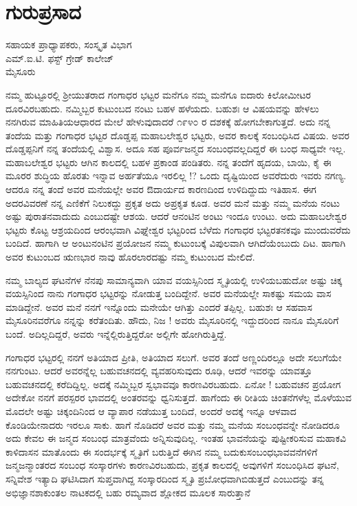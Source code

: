 {\fontsize{14}{16}\selectfont
\chapter{ಗುರುಪ್ರಸಾದ}

\begin{center}
\smallskip

ಸಹಾಯಕ ಪ್ರಾಧ್ಯಾಪಕರು, ಸಂಸ್ಕೃತ ವಿಭಾಗ\\
ಎಮ್.ಐ.ಟಿ. ಫಸ್ಟ್ ಗ್ರೇಡ್ ಕಾಲೇಜ್\\
ಮೈಸೂರು
\addrule
\end{center}

 ನಮ್ಮ ಹುಟ್ಟೂರಲ್ಲಿ ಶ್ರೀಯುತರಾದ ಗಂಗಾಧರ ಭಟ್ಟರ ಮನೆಗೂ ನಮ್ಮ ಮನೆಗೂ ಐದಾರು ಕಿಲೋಮೀಟರ ದೂರವಿರಬಹುದು. ನಮ್ಮಿಬ್ಬರ ಕುಟುಂಬದ ನಂಟು ಬಹಳ ಹಳೆಯದು. ಬಹುಶಃ ಆ  ವಿಷಯವನ್ನು ಹೇಳಲು ನನಗಿರುವ ಮಾಹಿತಿಯ\break ಆಧಾರದ ಮೇಲೆ ಹೇಳುವುದಾದರೆ ೧೯೪೦ ರ ದಶಕಕ್ಕೆ ಹೋಗಬೇಕಾಗುತ್ತದೆ. ಅದು ನನ್ನ ತಂದೆಯ ಮತ್ತು ಗಂಗಾಧರ ಭಟ್ಟರ ದೊಡ್ಡಪ್ಪ \enginline{-} ಮಹಾ\-ಬಲೇಶ್ವರ ಭಟ್ಟರು, ಅವರ ಕಾಲಕ್ಕೆ ಸಂಬಂಧಿಸಿದ ವಿಷಯ. ಅವರ ದೊಡ್ಡಪ್ಪನಿಗೆ ನನ್ನ ತಂದೆಯಲ್ಲಿ ವಿಶ್ವಾಸ. ಅದೂ ಸಹ ಪೂರ್ವಜನ್ಮದ ಸಂಬಂಧವಲ್ಲದಿದ್ದರೆ ಈ ಬಂಧ ಸಾಧ್ಯವೇ ಇಲ್ಲ. ಮಹಾ\-ಬಲೇಶ್ವರ ಭಟ್ಟರು ಆಗಿನ ಕಾಲದಲ್ಲಿ ಬಹಳ ಪ್ರಕಾಂಡ ಪಂಡಿತರು. ನನ್ನ ತಂದೆಗೆ ಹೃದಯ, ಬಾಯಿ, ಕೈ ಈ ಮೂರರ ಶುದ್ಧಿಯ ಹೊರತು ಇನ್ನಾವ ಅರ್ಹತೆಯೂ ಇರಲಿಲ್ಲ !? ಒಂದು ದೃಷ್ಟಿಯಿಂದ ಅವರೆದುರು ಇವರು ನಗಣ್ಯ. ಆದರೂ ನನ್ನ ತಂದೆ ಅವರ ಮನೆಯಲ್ಲೇ ಅವರ ಔದಾರ್ಯದ ಕಾರಣದಿಂದ ಉಳಿದಿದ್ದುದು ಇತಿಹಾಸ. ಈಗ ಅದರ\break ವಿವರಣೆ ನನ್ನ ಎಣಿಕೆಗೆ ನಿಲುಕದ್ದು \enginline{-} ಪ್ರಕೃತ ಅದು ಅಪ್ರಕೃತ ಕೂಡ. ಅವರ ಮನೆ ಮತ್ತು ನಮ್ಮ ಮನೆಯ ನಂಟು ಅಷ್ಟು ಪುರಾತನವಾದುದು ಎಂಬುದಷ್ಟೇ ಆಶಯ. ಆದರೆ ಆ\break ನಂಟಿನ ಅಂಟು ಇಂದೂ ಉಂಟು. ಅದು ಮಹಾಬಲೇಶ್ವರ ಭಟ್ಟರು ಕೊಟ್ಟ ಆಶ್ರಯ\-ದಿಂದ ಆರಂಭವಾಗಿ ವಿಘ್ನೇಶ್ವರ ಭಟ್ಟರಿಂದ ಬೆಳೆದು ಗಂಗಾಧರ ಭಟ್ಟರ\break ತನಕವೂ ಮುಂದುವರೆದು ಬಂದಿದೆ. ಹಾಗಾಗಿ ಆ ಅಂಟು\enginline{-}ನಂಟಿನ ಪ್ರಯೋಜನ ನಮ್ಮ ಕುಟುಂಬಕ್ಕೆ ವಿಪುಲವಾಗಿ ಆಗಿದೆಯೆಂಬುದು ದಿಟ. ಹಾಗಾಗಿ ಅವರ ಕುಟುಂಬದ ಋಣಭಾರ ನಾವು ಹೊರಲಾರದಷ್ಟು ನಮ್ಮ ಕುಟುಂಬದ ಮೇಲಿದೆ.

ನಮ್ಮ ಬಾಲ್ಯದ ಘಟನೆಗಳ ನೆನಪು ಸಾಮಾನ್ಯವಾಗಿ ಯಾವ ವಯಸ್ಸಿನಿಂದ ಸ್ಮೃತಿಯಲ್ಲಿ ಉಳಿಯಬಹುದೋ ಅಷ್ಟು ಚಿಕ್ಕ ವಯಸ್ಸಿನಿಂದ ನಾನು ಗಂಗಾಧರ ಭಟ್ಟರನ್ನು ನೋಡುತ್ತ ಬಂದಿದ್ದೇನೆ. ಅವರ ಮನೆಯಲ್ಲೇ ಸಾಕಷ್ಟು ಸಮಯ ವಾಸ ಮಾಡಿದ್ದೇನೆ. ಅವರ ಮನೆ ನನಗೆ ಇನ್ನೊಂದು ಮನೇಯೇ ಆಗಿತ್ತು ಎಂದರೆ ತಪ್ಪಿಲ್ಲ. ಬಹುಶಃ ಆ ಸಹವಾಸ ಮೈಸೂರಿನವರೆಗೂ ನನ್ನನ್ನು ಕರೆತಂದಿತು. ಹೌದು, ನಿಜ ! ಅವರು ಮೈಸೂರಿನಲ್ಲಿ ಇದ್ದುದರಿಂದ ನಾನೂ ಮೈಸೂರಿಗೆ ಬಂದೆ. ಅದಿಲ್ಲದಿದ್ದರೆ,  ಅವರು ಇನ್ನೆಲ್ಲಿರುತ್ತಿದ್ದರೋ ಅಲ್ಲಿಗೇ ಹೋಗಿರುತ್ತಿದ್ದೆ.

ಗಂಗಾಧರ ಭಟ್ಟರಲ್ಲಿ ನನಗೆ ಅತಿಯಾದ ಪ್ರೀತಿ, ಅತಿಯಾದ ಸಲುಗೆ. ಅವರ ತಂದೆ ಅಣ್ಣಂದಿರಲ್ಲೂ ಅದೇ ಸಲುಗೆಯೇ ನನಗುಂಟು. ಆದರೆ ಅವರನ್ನೆಲ್ಲ ಬಹುವಚನದಲ್ಲಿ ವ್ಯವಹರಿಸುವುದು ರೂಢಿ, ಆದರೆ ಇವರನ್ನು ಯಾವತ್ತೂ ಬಹುವಚನದಲ್ಲಿ ಕರೆದಿದ್ದಿಲ್ಲ. ಅದಕ್ಕೆ ನಮ್ಮಿಬ್ಬರ ಸ್ವಭಾವವೂ ಕಾರಣವಿರಬಹುದು. ಏನೋ ! ಬಹುವಚನ ಪ್ರಯೋಗ ಅದೇಕೋ ನನಗೆ ಪರಸ್ಪರರ ಭಾವದಲ್ಲಿ ಅಂತರವನ್ನು ಧ್ವನಿಸುತ್ತದೆ. ಹಾಗೆಂದು ಈ ರೀತಿಯ ಚಿಂತನೆಗಳೆಲ್ಲ ಮೊಳೆಯುವ ಮೊದಲೇ \enginline{-} ಅಷ್ಟು ಚಿಕ್ಕಂದಿನಿಂದ ಆ ವ್ಯಾಪಾರ ನಡೆಯುತ್ತ ಬಂದಿದೆ, ಅಂದರೆ ಅದಕ್ಕೆ ಇನ್ನೂ ಆಳವಾದ ಕೊಂಡಿಯೇನಾದರು ಇರಲೂ ಸಾಕು. ಹಾಗೆ ನೊಡಿದರೆ ಅವರ ಮತ್ತು ನಮ್ಮ ಮನೆಯ ಸಂಬಂಧವನ್ನೇ ನೋಡಿದರೂ ಅದು ಕೇವಲ ಈ ಜನ್ಮದ ಸಂಬಂಧ ಮಾತ್ರವೆಂದು ಅನ್ನಿಸುವುದಿಲ್ಲ. ಇಂತಹ ಭಾವನೆಯನ್ನು  ಪುಷ್ಟೀಕರಿಸುವ  ಮಹಾಕವಿ ಕಾಳಿದಾಸನ ಮಾತೊಂದು ಈ ಸಂದರ್ಭಕ್ಕೆ \hbox{ಸ್ಮೃತಿಗೆ} ಬರುತ್ತಿದೆ \enginline{-} ಈಗಿನ ನಮ್ಮ ಬದುಕು\enginline{-}ಸಂಬಂಧ\enginline{-}ಭಾವವನೆಗಳಿಗೆ ಜನ್ಮ\enginline{-}ಜನ್ಮಾಂತರದ ಸಂಬಂಧ \enginline{-} ಸಂಸ್ಕಾರಗಳು ಕಾರಣವಿರಬಹುದು, ಪ್ರಕೃತ ಕಾಲದಲ್ಲಿ ಅವುಗಳಿಗೆ \break ಸಂಬಂಧಿಸಿದ ಘಟನೆ, ಸನ್ನಿವೇಶ  ಇತ್ಯಾದಿ  ಘಟಿಸಿದಾಗ ಸುಪ್ತವಾಗಿದ್ದ ಸಂಸ್ಕಾರದಿಂದ ಸ್ಮೃತಿ  ಪ್ರಬೋಧವಾಗಿಬಿಡುತ್ತದೆ  ಎಂಬುದನ್ನು ತನ್ನ ಅಭಿಜ್ಞಾನಶಾಕುಂತಲ ನಾಟಕದಲ್ಲಿ ಬಹು ರಮ್ಯವಾದ ಶ್ಲೋಕದ ಮೂಲಕ ಸಾರುತ್ತಾನೆ \enginline{-} 

}
